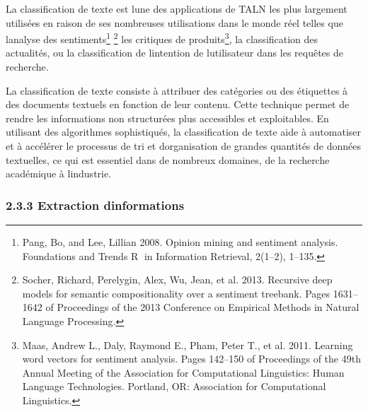 \documentclass[
]{article}
\begin{document}
La classification de texte est l\textquotesingle une des applications de
TALN les plus largement utilisées en raison de ses nombreuses
utilisations dans le monde réel telles que l\textquotesingle analyse des
sentiments\footnote{Pang, Bo, and Lee, Lillian 2008. Opinion mining and
  sentiment analysis. Foundations and Trends R⃝ in Information Retrieval,
  2(1--2), 1--135.} \footnote{Socher, Richard, Perelygin, Alex, Wu,
  Jean, et al. 2013. Recursive deep models for semantic compositionality
  over a sentiment treebank. Pages 1631--1642 of Proceedings of the 2013
  Conference on Empirical Methods in Natural Language Processing.} les
critiques de produits\footnote{Maas, Andrew L., Daly, Raymond E., Pham,
  Peter T., et al. 2011. Learning word vectors for sentiment analysis.
  Pages 142--150 of Proceedings of the 49th Annual Meeting of the
  Association for Computational Linguistics: Human Language
  Technologies. Portland, OR: Association for Computational Linguistics.},
la classification des actualités, ou la classification de
l\textquotesingle intention de l\textquotesingle utilisateur dans les
requêtes de recherche.

La classification de texte consiste à attribuer des catégories ou des
étiquettes à des documents textuels en fonction de leur contenu. Cette
technique permet de rendre les informations non structurées plus
accessibles et exploitables. En utilisant des algorithmes sophistiqués,
la classification de texte aide à automatiser et à accélérer le
processus de tri et d\textquotesingle organisation de grandes quantités
de données textuelles, ce qui est essentiel dans de nombreux domaines,
de la recherche académique à l\textquotesingle industrie.

\subsubsection{2.3.3 Extraction
d\textquotesingle informations}\label{extraction-dinformations}
\end{document}
